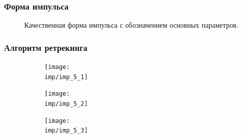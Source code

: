 \documentclass[10pt,pdf,hyperref={unicode}, dvipsnames]{beamer}
\begin{document}
    

\begin{frame}
\frametitle{Форма импульса}
\vskip -3pt
    \begin{figure}[h]
        \centering
        \def\svgwidth{0.8\linewidth}
        
        \caption{Качественная форма импульса с обозначением основных параметров.}
        \label{fig:impuls}
    \end{figure}
\end{frame}

\begin{frame}
\frametitle{Алгоритм ретрекинга}
\vskip -3pt
\def\imp{fig/retracking}
\begin{figure}
    \centering
    \begin{subfigure}{0.49\linewidth}
        \centering
        \texttt{[image: \\imp/imp\_5\_1]}
    \end{subfigure}
    \begin{subfigure}{0.49\linewidth}
        \centering
        \texttt{[image: \\imp/imp\_5\_2]}
    \end{subfigure}
    \begin{subfigure}{0.49\linewidth}
        \centering
        \texttt{[image: \\imp/imp\_5\_3]}
    \end{subfigure}
\end{figure}
\end{frame}
\end{document}
